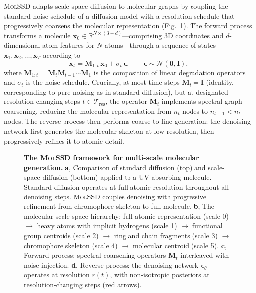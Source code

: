 \documentclass[11pt]{article}
\newcommand{\molssd}{\textsc{MolSSD}}
\newcommand{\vx}{\mathbf{x}}
\newcommand{\ve}{\boldsymbol{\epsilon}}
\newcommand{\mM}{\mathbf{M}}
\newcommand{\mI}{\mathbf{I}}
\newcommand{\normal}{\mathcal{N}}
\newcommand{\R}{\mathbb{R}}
\begin{document}
\molssd{} adapts scale-space diffusion to molecular graphs by coupling the standard noise schedule of a diffusion model with a resolution schedule that progressively coarsens the molecular representation (Fig.~\ref{fig:framework}). The forward process transforms a molecule $\vx_0 \in \R^{N \times (3+d)}$---comprising 3D coordinates and $d$-dimensional atom features for $N$ atoms---through a sequence of states $\vx_1, \vx_2, \ldots, \vx_T$ according to
\begin{equation}
\label{eq:forward}
    \vx_t = \mM_{1:t}\,\vx_0 + \sigma_t\,\ve, \qquad \ve \sim \normal(\mathbf{0}, \mI),
\end{equation}
where $\mM_{1:t} = \mM_t \mM_{t-1} \cdots \mM_1$ is the composition of linear degradation operators and $\sigma_t$ is the noise schedule. Crucially, at most time steps $\mM_t = \mI$ (identity, corresponding to pure noising as in standard diffusion), but at designated resolution-changing steps $t \in \mathcal{T}_{\text{res}}$, the operator $\mM_t$ implements spectral graph coarsening, reducing the molecular representation from $n_t$ nodes to $n_{t+1} < n_t$ nodes. The reverse process then performs coarse-to-fine generation: the denoising network first generates the molecular skeleton at low resolution, then progressively refines it to atomic detail.

\begin{figure}[t]
    \centering
    \caption{\textbf{The \molssd{} framework for multi-scale molecular generation.} \textbf{a}, Comparison of standard diffusion (top) and scale-space diffusion (bottom) applied to a UV-absorbing molecule. Standard diffusion operates at full atomic resolution throughout all denoising steps. \molssd{} couples denoising with progressive refinement from chromophore skeleton to full molecule. \textbf{b}, The molecular scale space hierarchy: full atomic representation (scale 0) $\to$ heavy atoms with implicit hydrogens (scale 1) $\to$ functional group centroids (scale 2) $\to$ ring and chain fragments (scale 3) $\to$ chromophore skeleton (scale 4) $\to$ molecular centroid (scale 5). \textbf{c}, Forward process: spectral coarsening operators $\mM_t$ interleaved with noise injection. \textbf{d}, Reverse process: the denoising network $\ve_\theta$ operates at resolution $r(t)$, with non-isotropic posteriors at resolution-changing steps (red arrows).}
    \label{fig:framework}
\end{figure}
\end{document}
